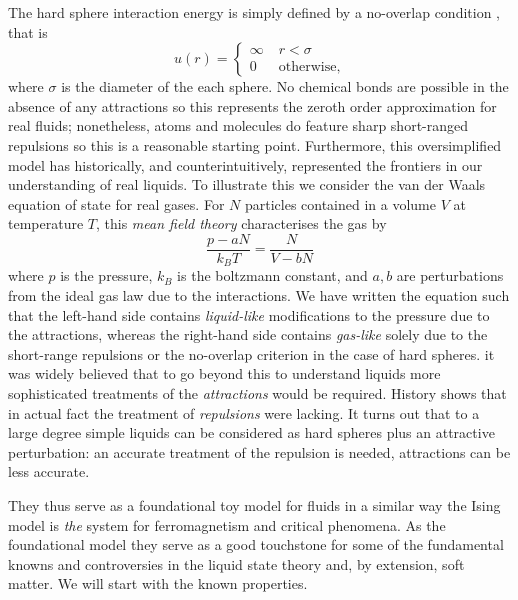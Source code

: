 \documentclass[11pt,twoside]{report}
\begin{document}
The hard sphere interaction energy is simply defined by a no-overlap condition%
,
that is
\begin{equation}\label{eq:hs-interaction}
  u(r) =
  \begin{cases}
    \infty & \; r < \sigma \\
    0 & \; \textrm{otherwise},
  \end{cases}
\end{equation}
where $\sigma$ is the diameter of the each sphere.
No chemical bonds are possible in the absence of any attractions so this represents the zeroth order approximation for real fluids; nonetheless, atoms and molecules do feature sharp short-ranged repulsions so this is a reasonable starting point.
Furthermore, this oversimplified model has historically, and counterintuitively, represented the frontiers in our understanding of real liquids.
To illustrate this we consider the van der Waals equation of state for real gases.
For $N$ particles contained in a volume $V$ at temperature $T$, this \emph{mean field theory} characterises the gas by
\begin{equation}\label{eq:van-der-waals}
  \frac{p - a N}{k_B T} = \frac{N}{V - b N}
\end{equation}
where $p$ is the pressure, $k_B$ is the boltzmann constant, and $a,b$ are perturbations from the ideal gas law due to the interactions.
We have written the equation such that the left-hand side contains \emph{liquid-like} modifications to the pressure due to the attractions, whereas the right-hand side contains \emph{gas-like} solely due to the short-range repulsions or the no-overlap criterion in the case of hard spheres.
it was widely believed that to go beyond this to understand liquids more sophisticated treatments of the \emph{attractions} would be required.
History shows that in actual fact the treatment of \emph{repulsions} were lacking.
It turns out that to a large degree simple liquids can be considered as hard spheres plus an attractive perturbation: an accurate treatment of the repulsion is needed, attractions can be less accurate.

They thus serve as a foundational toy model for fluids in a similar way the Ising model is \emph{the} system for ferromagnetism and critical phenomena.
As the foundational model they serve as a good touchstone for some of the fundamental knowns and controversies in the liquid state theory and, by extension, soft matter.
We will start with the known properties.
\end{document}
